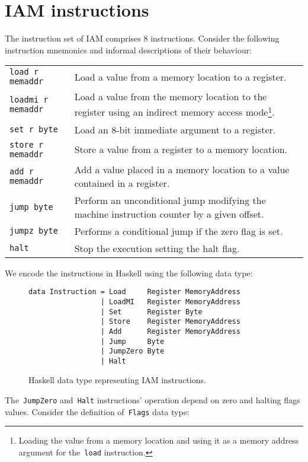 \section{IAM instructions}
\label{sec:Instructions}

The instruction set of IAM comprises 8 instructions. Consider the following
instruction mnemonics and informal descriptions of their behaviour:

\begin{longtable}{l|p{9cm}}
\texttt{load r memaddr}     & Load a value from a memory location to a register.\\
\texttt{loadmi r memaddr}   & Load a value from the memory location to the register using
an indirect memory access mode\footnote{Loading the value from a memory location and using it as
a memory address argument for the~\texttt{load} instruction.}.\\
\texttt{set      r byte   } & Load an 8-bit immediate argument to a register.\\
\texttt{store    r memaddr} & Store a value from a register to a memory location.\\
\texttt{add      r memaddr} & Add a value placed in a memory location to a value contained in a register.\\
\texttt{jump     byte     } & Perform an unconditional jump modifying the machine
instruction counter by a given offset.\\
\texttt{jumpz    byte     } & Performs a conditional jump if the zero flag is set.\\
\texttt{halt              } & Stop the execution setting the halt flag.
\end{longtable}

We encode the instructions in Haskell using the following data type:

\begin{figure}[H]
\begin{verbatim}
data Instruction = Load     Register MemoryAddress
                 | LoadMI   Register MemoryAddress
                 | Set      Register Byte
                 | Store    Register MemoryAddress
                 | Add      Register MemoryAddress
                 | Jump     Byte
                 | JumpZero Byte
                 | Halt
\end{verbatim}
\caption{Haskell data type representing IAM instructions.}
\label{Instruction}
\end{figure}

The~\texttt{JumpZero} and~\texttt{Halt} instructions'
operation depend on zero and halting flags values. Consider the definition
of~\texttt{Flags} data type:

